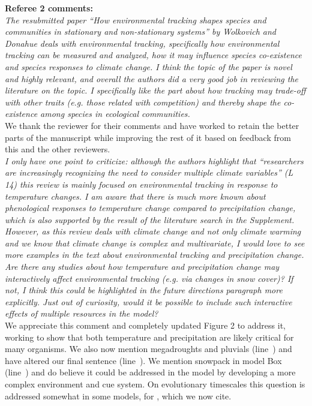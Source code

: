 \documentclass[11pt]{article}
\newcommand{\lr}[1]{line~\lineref{#1}}
\begin{document}
{\bf Referee 2 comments:} \\

\emph{The resubmitted paper “How environmental tracking shapes species and communities in
stationary and non-stationary systems” by Wolkovich and Donahue deals with environmental
tracking, specifically how environmental tracking can be measured and analyzed, how it may
influence species co-existence and species responses to climate change. I think the topic of
the paper is novel and highly relevant, and overall the authors did a very good job in
reviewing the literature on the topic. I specifically like the part about how tracking may
trade-off with other traits (e.g. those related with competition) and thereby shape the co-
existence among species in ecological communities.}\\

We thank the reviewer for their comments and have worked to retain the better parts of the manuscript while improving the rest of it based on feedback from this and the other reviewers.\\

\emph{I only have one point to criticize: although the authors highlight that “researchers are
increasingly recognizing the need to consider multiple climate variables” (L 14) this review
is mainly focused on environmental tracking in response to temperature changes. I am aware
that there is much more known about phenological responses to temperature change compared to
precipitation change, which is also supported by the result of the literature search in the
Supplement. However, as this review deals with climate change and not only climate warming
and we know that climate change is complex and multivariate, I would love to see more
examples in the text about environmental tracking and precipitation change. Are there any
studies about how temperature and precipitation change may interactively affect environmental
tracking (e.g. via changes in snow cover)? If not, I think this could be highlighted in the
future directions paragraph more explicitly. Just out of curiosity, would it be possible to
include such interactive effects of multiple resources in the model?}\\

We appreciate this comment and completely updated Figure 2 to address it, working to show that both temperature and precipitation are likely critical for many organisms. We also now mention megadroughts and pluvials (\lr{r2precip2}) and have altered our final sentence (\lr{r2precip3}). We mention snowpack in model Box (\lr{r2precip}) and do believe it could be addressed in the model by developing a more complex environment and cue system. On evolutionary timescales this question is addressed somewhat in some models, for \citet{chevin2015}, which we now cite.\\
\end{document}
